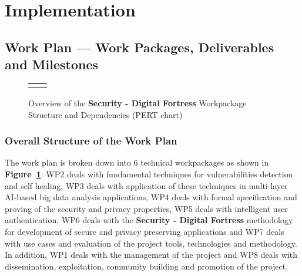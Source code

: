 \documentclass[a4paper,11pt]{article}
\newcommand{\project}[1]{\textbf{#1}\xspace}
\newcommand{\SECURITY}{\project{Security - Digital Fortress}}
\newcommand{\TheProject}{\SECURITY}
\begin{document}
\clearpage



\clearpage
\section{Implementation}

\subsection{Work Plan --- Work Packages, Deliverables and Milestones}
\label{sect:workplan}


\begin{figure}[tp]
\begin{center}
\vspace{-5mm}
\begin{tabular}{ll}
\hspace{-0.75in}
[scale=0.5]{PertChart.pdf}
\vspace{-10mm}
\end{tabular}
\caption{Overview of the \TheProject{} Workpackage Structure and Dependencies (PERT chart)}
\label{fig:wps}
\end{center}
\end{figure}

\subsubsection*{Overall Structure of the Work Plan}

The work plan is broken down into 6 technical workpackages as shown
in \textbf{Figure~\ref{fig:wps}}: WP2 deals with fundamental techniques for vulnerabilities detection and self healing, WP3 deals with application of these techniques in multi-layer AI-based big data analysis applications, WP4 deals with formal specification and proving of the security and privacy properties, WP5 deals with intelligent user authentication, WP6 deals with the \TheProject{} methodology for development of secure and privacy preserving applications and WP7 deals with use cases and evaluation of the project tools, technologies and methodology. In addition, WP1 deals with the management of the project and WP8 deals with dissemination, exploitation, community building and promotion of the project.


\end{document}
